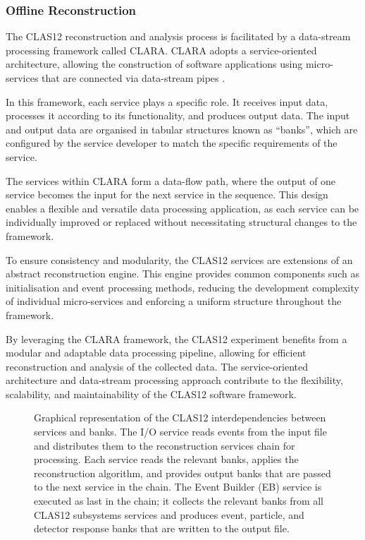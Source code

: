 \subsubsection{Offline Reconstruction}
\label{sssec::offline_reconstruction}
    The CLAS12 reconstruction and analysis process is facilitated by a data-stream processing framework called CLARA.
    CLARA adopts a service-oriented architecture, allowing the construction of software applications using micro-services that are connected via data-stream pipes \cite{gyurgyan2016}.

    In this framework, each service plays a specific role.
    It receives input data, processes it according to its functionality, and produces output data.
    The input and output data are organised in tabular structures known as ``banks'', which are configured by the service developer to match the specific requirements of the service.

    The services within CLARA form a data-flow path, where the output of one service becomes the input for the next service in the sequence.
    This design enables a flexible and versatile data processing application, as each service can be individually improved or replaced without necessitating structural changes to the framework.

    To ensure consistency and modularity, the CLAS12 services are extensions of an abstract reconstruction engine.
    This engine provides common components such as initialisation and event processing methods, reducing the development complexity of individual micro-services and enforcing a uniform structure throughout the framework.

    By leveraging the CLARA framework, the CLAS12 experiment benefits from a modular and adaptable data processing pipeline, allowing for efficient reconstruction and analysis of the collected data.
    The service-oriented architecture and data-stream processing approach contribute to the flexibility, scalability, and maintainability of the CLAS12 software framework.

    \begin{figure}[b!]
        \centering{}
        \caption[CLAS12 Reconstruction Chain.]{Graphical representation of the CLAS12 interdependencies between services and banks.
        The I/O service reads events from the input file and distributes them to the reconstruction services chain for processing.
        Each service reads the relevant banks, applies the reconstruction algorithm, and provides output banks that are passed to the next service in the chain.
        The Event Builder (EB) service is executed as last in the chain; it collects the relevant banks from all CLAS12 subsystems services and produces event, particle, and detector response banks that are written to the output file.}
        \label{fig::recon_chain}
    \end{figure}

